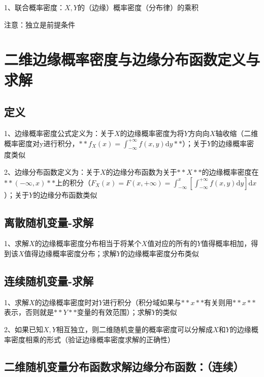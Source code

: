 1、联合概率密度：$ X,Y $的（边缘）概率密度（分布律）的乘积

注意：独立是前提条件

\section{二维边缘概率密度与边缘分布函数定义与求解}



\subsection{定义}

1、边缘概率密度公式定义为：关于$ X $的边缘概率密度为将$ Y $方向向$ X $轴收缩（二维概率密度对y进行积分，$ **f_{X}(x)=\int_{-\infty}^{+\infty} f(x, y) \mathrm{d} y** $）；关于$ Y $的边缘概率密度类似

2、边缘分布函数定义为：关于$ X $的边缘分布函数为关于$ **X** $的边缘概率密度在$ **(-\infty,x)** $上的积分（$ F_{X}(x)=F(x,+\infty)=\int_{-\infty}^{x}\left[\int_{-\infty}^{+\infty} f(x, y) \mathrm{d} y\right] \mathrm{d} x $）；关于$ Y $的边缘分布函数类似



\subsection{离散随机变量-求解}

1、求解$ X $的边缘概率密度分布相当于将某个$ X $值对应的所有的$ Y $值得概率相加，得到该$ X $值得边缘概率密度分布；求解$ Y $的边缘概率密度分布类似



\subsection{连续随机变量-求解}

1、求解$ X $的边缘概率密度时对$ Y $进行积分（积分域如果与$ **x** $有关则用$ **x** $表示，否则就是$ **Y** $变量的有效范围）；求解$ Y $的类似

2、如果已知$ X,Y $相互独立，则二维随机变量的概率密度可以分解成$ X $和$ Y $的边缘概率密度相乘的形式（验证边缘概率密度求解的正确性）



\subsection{二维随机变量分布函数求解边缘分布函数：（连续）}

